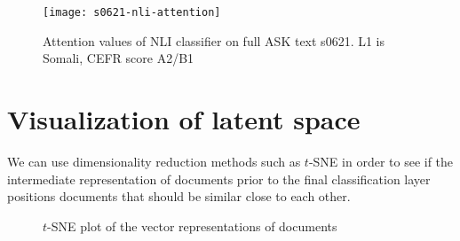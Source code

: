 \begin{figure}
  \centering
  \texttt{[image: s0621-nli-attention]}
  \caption{Attention values of NLI classifier on full ASK text s0621.
           L1 is Somali, CEFR score A2/B1}
  \label{fig:s0621-nli-attention}
\end{figure}


\section{Visualization of latent space}

We can use dimensionality reduction methods such as $t$-SNE in order to see
if the intermediate representation of documents prior to the final
classification layer positions documents that should be similar close to each
other.

\begin{figure}
  \centering
  \caption{$t$-SNE plot of the vector representations of documents}
  \label{fig:cefr-t-sne}
\end{figure}
